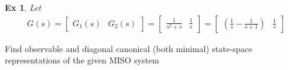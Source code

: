 \documentclass[twoside]{article}
\newtheorem{exmp}[theorem]{Ex}
\begin{document}
\begin{exmp}
Let %
\begin{align*}
	G(s) = \left[ \begin{array}{cc} G_1(s) & G_2(s) \end{array} \right] = 
	       \left[ \begin{array}{cc} \frac{ 1 }{ s^2 + s }  &
	        \frac{ 1 }{ s }   \end{array} \right] =  \left[ \begin{array}{cc} \left( \frac{ 1 }{ s }  - \frac{ 1 }{ s + 1 } \right) &
	        \frac{ 1 }{ s }  \end{array} \right] 
\end{align*}
%  
\end{exmp}
%
Find observable and diagonal canonical (both minimal) state-space representations of the given MISO system
\end{document}
